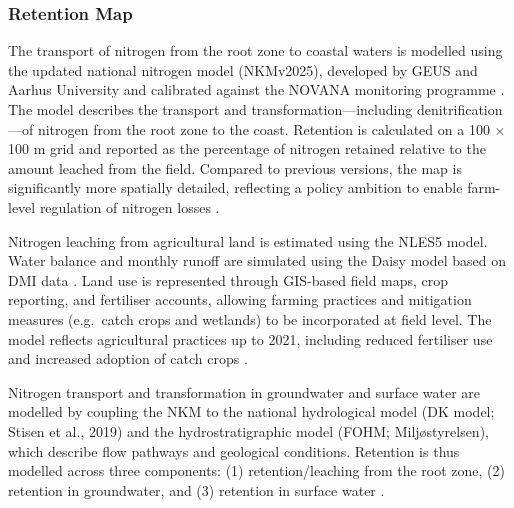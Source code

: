 \documentclass[12pt]{article}
\begin{document}
\subsubsection{Retention Map}
The transport of nitrogen from the root zone to coastal waters is modelled using the updated national nitrogen model (NKMv2025), developed by GEUS and Aarhus University and calibrated against the NOVANA monitoring programme \citep{Hojberg2025}. The model describes the transport and transformation---including denitrification---of nitrogen from the root zone to the coast. Retention is calculated on a 100 $\times$ 100 m grid and reported as the percentage of nitrogen retained relative to the amount leached from the field. Compared to previous versions, the map is significantly more spatially detailed, reflecting a policy ambition to enable farm-level regulation of nitrogen losses 
\citep{Hojberg2025}.

Nitrogen leaching from agricultural land is estimated using the NLES5 model. Water balance and monthly runoff are simulated using the Daisy model based on DMI data \citep{Hojberg2025}. Land use is represented through GIS-based field maps, crop reporting, and fertiliser accounts, allowing farming practices and mitigation measures (e.g.\ catch crops and wetlands) to be 
incorporated at field level. The model reflects agricultural practices up to 2021, including reduced fertiliser use and increased adoption of catch crops \citep{Hojberg2025}.

Nitrogen transport and transformation in groundwater and surface water are modelled by coupling the NKM to the national hydrological model (DK model; Stisen et al., 2019) and the hydrostratigraphic model (FOHM; Miljøstyrelsen), which describe flow pathways and geological conditions. 
Retention is thus modelled across three components: (1) retention/leaching from the root zone, (2) retention in groundwater, and (3) retention 
in surface water \citep{Hojberg2025}.


\end{document}
